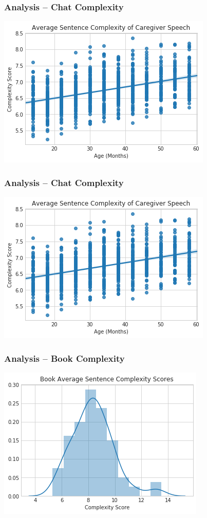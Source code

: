\documentclass{beamer}
\begin{document}
\begin{frame}
	\frametitle{Analysis --  Chat Complexity}
	\begin{center}
		\includegraphics[width=.8\linewidth]{../real_plots/p_complex.png}
	\end{center}
\end{frame}
\begin{frame}
	\frametitle{Analysis --  Chat Complexity}
	\begin{center}
		\includegraphics[width=.8\linewidth]{../real_plots/p_complex.png}
	\end{center}
\end{frame}
\begin{frame}
	\frametitle{Analysis -- Book Complexity}
	\begin{center}
		\includegraphics[width=.8\linewidth]{../real_plots/bookscoresdist.png}
	\end{center}
\end{frame}
\end{document}
